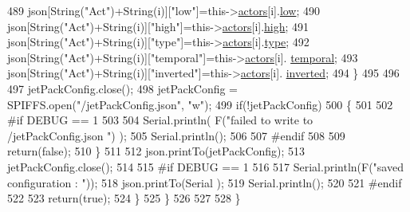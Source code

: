 \begin{DoxyCode}
489                 json[String(\textcolor{stringliteral}{"Act"})+String(i)][\textcolor{stringliteral}{"low"}]=this->\hyperlink{class_jetpack_a7e16d2f97837f9712a2e6de1c50d99db}{actors}[i].\hyperlink{struct_jetpack_1_1state_ace3ecd2b1f262756d8f7a8adda20136a}{low};
490                 json[String(\textcolor{stringliteral}{"Act"})+String(i)][\textcolor{stringliteral}{"high"}]=this->\hyperlink{class_jetpack_a7e16d2f97837f9712a2e6de1c50d99db}{actors}[i].\hyperlink{struct_jetpack_1_1state_a54cc9291c7cc30102a07fd2b0ccd8dde}{high};
491                 json[String(\textcolor{stringliteral}{"Act"})+String(i)][\textcolor{stringliteral}{"type"}]=this->\hyperlink{class_jetpack_a7e16d2f97837f9712a2e6de1c50d99db}{actors}[i].\hyperlink{struct_jetpack_1_1state_a9143580871c2e573fb502bb94c1da8e5}{type};
492                 json[String(\textcolor{stringliteral}{"Act"})+String(i)][\textcolor{stringliteral}{"temporal"}]=this->\hyperlink{class_jetpack_a7e16d2f97837f9712a2e6de1c50d99db}{actors}[i].
      \hyperlink{struct_jetpack_1_1state_abd6039e7a48856550b0ffbf8bcff7bdd}{temporal};
493                 json[String(\textcolor{stringliteral}{"Act"})+String(i)][\textcolor{stringliteral}{"inverted"}]=this->\hyperlink{class_jetpack_a7e16d2f97837f9712a2e6de1c50d99db}{actors}[i].
      \hyperlink{struct_jetpack_1_1state_a6bc03bb8f05b10aa142dbb0c39c87fb5}{inverted}; 
494             \}
495             
496 
497             jetPackConfig.close();          
498             jetPackConfig = SPIFFS.open(\textcolor{stringliteral}{"/jetPackConfig.json"}, \textcolor{stringliteral}{"w"});            
499             \textcolor{keywordflow}{if}(!jetPackConfig)
500             \{
501             
502 \textcolor{preprocessor}{            #if DEBUG == 1 }
503 
504                 Serial.println( F(\textcolor{stringliteral}{"failed to write to /jetPackConfig.json "}) );
505                 Serial.println();
506             
507 \textcolor{preprocessor}{            #endif}
508                 
509                 \textcolor{keywordflow}{return}(\textcolor{keyword}{false});          
510             \}  
511 
512             json.printTo(jetPackConfig);
513             jetPackConfig.close();
514 
515 \textcolor{preprocessor}{        #if DEBUG == 1 }
516             
517             Serial.println(F(\textcolor{stringliteral}{"saved configuration : "}));
518             json.printTo(Serial );
519             Serial.println();       
520         
521 \textcolor{preprocessor}{        #endif}
522 
523             \textcolor{keywordflow}{return}(\textcolor{keyword}{true}); 
524         \}
525     \}   
526     
527 
528 \}
\end{DoxyCode}
